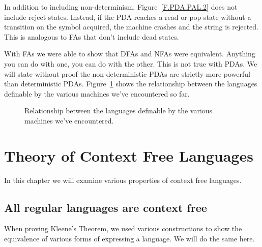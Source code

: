 \documentclass[letterpaper,12pt,openany,reqno]{book}%
\begin{document}
In addition to including non-determinism, Figure~\ref{F.PDA.PAL.2} does not include reject states. Instead, if the PDA reaches a read or pop state without a transition on the symbol acquired, the machine crashes and the string is rejected. This is analogous to FAs that don't include dead states. 

With FAs we were able to show that DFAs and NFAs were equivalent. Anything you can do with one, you can do with the other. This is not true with PDAs. We will state without proof the non-deterministic PDAs are strictly more powerful than deterministic PDAs. Figure~\ref{F.machine.sizes.1} shows the relationship between the languages definable by the various machines we've encountered so far.
\begin{figure}[htbp]
\centering
{} %
\caption{Relationship between the languages definable by the various machines we've encountered.}
\label{F.machine.sizes.1}
\end{figure}

\chapter{Theory of Context Free Languages}
In this chapter we will examine various properties of context free languages.
\section{All regular languages are context free}
When proving Kleene's Theorem, we used various constructions to show the equivalence of various forms of expressing a language. We will do the same here.
\end{document}
